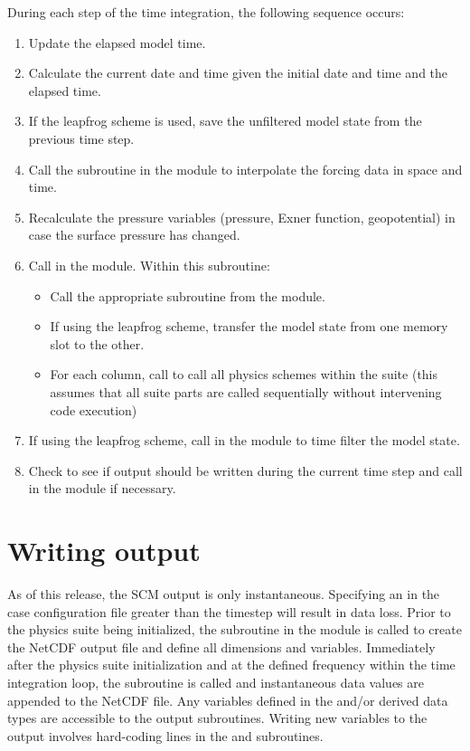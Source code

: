 During each step of the time integration, the following sequence occurs:
\begin{enumerate}
\item Update the elapsed model time.
\item Calculate the current date and time given the initial date and time and the elapsed time.
\item If the leapfrog scheme is used, save the unfiltered model state from the previous time step.
\item Call the  subroutine in the  module to interpolate the forcing data in space and time.
\item Recalculate the pressure variables (pressure, Exner function, geopotential) in case the surface pressure has changed.
\item Call  in the  module. Within this subroutine:
\begin{itemize}
\item Call the appropriate  subroutine from the  module.
\item If using the leapfrog scheme, transfer the model state from one memory slot to the other.
\item For each column, call  to call all physics schemes within the suite (this assumes that all suite parts are called sequentially without intervening code execution)
\end{itemize}
\item If using the leapfrog scheme, call  in the  module to time filter the model state.
\item Check to see if output should be written during the current time step and call  in the  module if necessary.
\end{enumerate}

\section{Writing output}
As of this release, the SCM output is only instantaneous. Specifying an  in the case configuration file greater than the timestep will result in data loss. Prior to the physics suite being initialized, the  subroutine in the  module is called to create the NetCDF output file and define all dimensions and variables. Immediately after the physics suite initialization and at the defined frequency within the time integration loop, the  subroutine is called and instantaneous data values are appended to the NetCDF file. Any variables defined in the  and/or  derived data types are accessible to the output subroutines. Writing new variables to the output involves hard-coding lines in the  and  subroutines.
